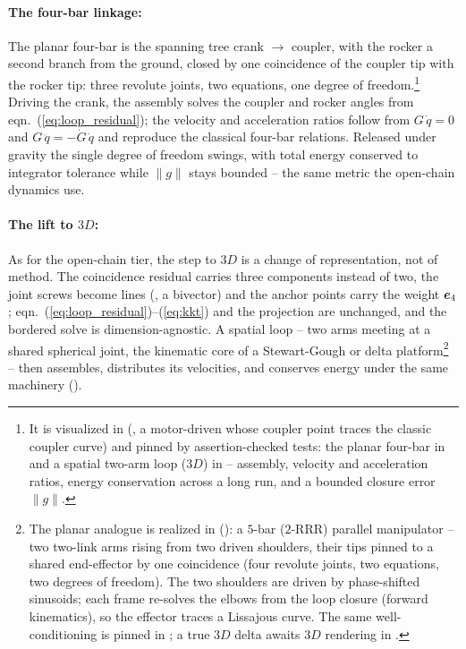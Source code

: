 \paragraph{The four-bar linkage:} The planar four-bar is the spanning tree crank $\to$
coupler, with the rocker a second branch from the ground, closed by one coincidence of the
coupler tip with the rocker tip: three revolute joints, two equations, one degree of
freedom.\footnote{It is visualized in 
(, a motor-driven  whose
coupler point traces the classic coupler curve) and pinned by assertion-checked tests: the
planar four-bar in  and a spatial two-arm loop
($3D$) in  -- assembly, velocity and acceleration ratios,
energy conservation across a long run, and a bounded closure error $\lVert g\rVert$.}
Driving the
crank, the assembly solves the coupler and rocker angles from
eqn.~(\ref{eq:loop_residual}); the velocity and acceleration ratios follow from
$G\,\dot{q} = 0$ and $G\,\ddot{q} = -\dot{G}\,\dot{q}$ and reproduce the classical
four-bar relations. Released under gravity the single degree of freedom swings, with total
energy conserved to integrator tolerance while $\lVert g\rVert$ stays bounded -- the same
metric the open-chain dynamics use.

\paragraph{The lift to $3D$:} As for the open-chain tier, the step to $3D$ is a change of
representation, not of method. The coincidence residual carries three components instead
of two, the joint screws become lines (, a bivector) and the anchor points
carry the weight $\bm{e}_{4}$; eqn.~(\ref{eq:loop_residual})--(\ref{eq:kkt}) and the
projection are unchanged, and the bordered solve is dimension-agnostic. A spatial loop --
two arms meeting at a shared spherical joint, the kinematic core of a Stewart-Gough or
delta platform\footnote{The planar analogue is realized in 
(): a $5$-bar ($2$-RRR) parallel manipulator -- two
two-link arms rising from two driven shoulders, their tips pinned to a shared end-effector
by one coincidence (four revolute joints, two equations, two degrees of freedom). The two
shoulders are driven by phase-shifted sinusoids; each frame re-solves the elbows from the
loop closure (forward kinematics), so the effector traces a Lissajous curve. The same
well-conditioning is pinned in ; a true $3D$
delta awaits $3D$ rendering in .} -- then assembles, distributes its
velocities, and conserves energy under the same machinery ().


